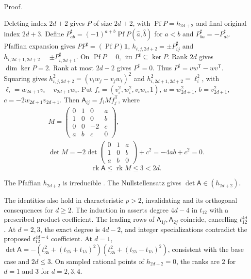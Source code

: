 \documentclass[11pt]{article}
\numberwithin{equation}{section}
\numberwithin{figure}{section}
\numberwithin{table}{section}
\begin{document}
\begin{proofbox}
Proof.

Deleting index $2d+2$ gives $P$ of size $2d+2$, with $\operatorname{Pf}P=h_{2d+2}$ and final original index $2d+3$. Define $P^\sharp_{ab}=(-1)^{a+b}\operatorname{Pf}P(\hat a,\hat b)$ for $a<b$ and $P^\sharp_{ba}=-P^\sharp_{ab}$. Pfaffian expansion gives $PP^\sharp=(\operatorname{Pf}P)\mathbf1$, $h_{i,j,2d+2}=\pm P^\sharp_{ij}$ and $h_{i,2d+1,2d+2}=\pm P^\sharp_{i,2d+1}$. On $\operatorname{Pf}P=0$, $\operatorname{im}P^\sharp\subseteq\ker P$. Rank $2d$ gives $\dim\ker P=2$. Rank at most $2d-2$ gives $P^\sharp=0$. Thus $P^\sharp=vw^{\mathsf T}-wv^{\mathsf T}$. Squaring gives $h^2_{i,j,2d+2}=(v_iw_j-v_jw_i)^2$ and $h^2_{i,2d+1,2d+2}=\ell_i^2$, with $\ell_i=w_{2d+1}v_i-v_{2d+1}w_i$. Put $f_i=(v_i^2,w_i^2,v_iw_i,1)$, $a=w_{2d+1}^2$, $b=v_{2d+1}^2$, $c=-2w_{2d+1}v_{2d+1}$. Then $\mathsf A_{ij}=f_iMf_j^{\mathsf T}$, where
\begin{equation}\label{eq-E-SXX-M}
\begin{gathered}M=\begin{pmatrix}0&1&0&a\\1&0&0&b\\0&0&-2&c\\a&b&c&0\end{pmatrix},\\ \det M=-2\det\begin{pmatrix}0&1&a\\1&0&b\\a&b&0\end{pmatrix}+c^2=-4ab+c^2=0.\end{gathered}
\end{equation}
\begin{equation*}
\operatorname{rk}\mathsf A\le\operatorname{rk}M\le3<2d.
\end{equation*}

The Pfaffian $h_{2d+2}$ is irreducible \cite[Lemma B.2.10]{GoodmanWallach}. The Nullstellensatz gives $\det\mathsf A\in(h_{2d+2})$.\hfill\qedsymbol
\end{proofbox}

The identities also hold in characteristic $p>2$, invalidating \cite[Lemma 5.2]{SXX} and its orthogonal consequences for $d\ge2$. The induction in \cite[Lemma 5.2]{SXX} asserts degree $4d-4$ in $t_{12}$ with a prescribed product coefficient. The leading rows of $\mathsf A_{1j},\mathsf A_{2j}$ coincide, cancelling $t_{12}^{4d}$. At $d=2,3$, the exact degree is $4d-2$, and integer specializations contradict the proposed $t_{12}^{4d-4}$ coefficient. At $d=1$, $\det\mathsf A=-(t_{35}^2+(t_{25}+t_{15})^2)(t_{35}^2+(t_{25}-t_{15})^2)$, consistent with the base case and $2d\le3$. On sampled rational points of $h_{2d+2}=0$, the ranks are $2$ for $d=1$ and $3$ for $d=2,3,4$.
\end{document}
